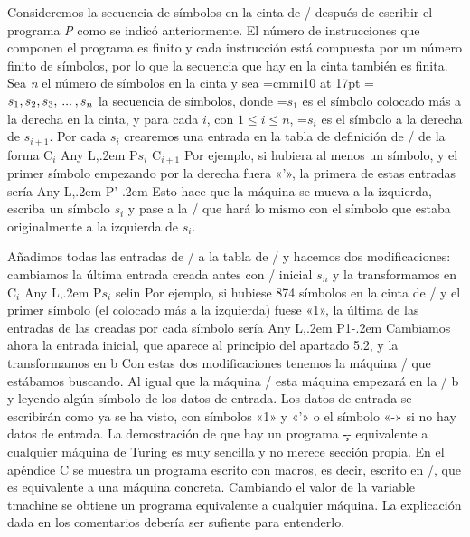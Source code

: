 Consideremos la secuencia de símbolos en la cinta de \E/ después de escribir el programa {\it P}
como se indicó anteriormente. El número de instrucciones que componen el programa es finito y cada
instrucción está compuesta por un número finito de símbolos, por lo que la secuencia que hay en la
cinta también es finita. Sea {\it n} el número de símbolos en la cinta y sea
\encaje
\font\mathlista=cmmi10 at 17pt
=\mathlista
$ s_1, s_2, s_3,\kern.2em ... \kern.2em, s_n $
\finencaje
la secuencia de símbolos, donde {=\mathlista $ s_1 $} es el símbolo colocado más a la derecha
en la cinta, y para cada $ i $, con $ 1\le i \le n $, {=\mathlista $ s_i $ es el símbolo a
la derecha de $ s_{i+1} $}. Por cada $ s_i $ crearemos una entrada en la tabla de definición
de \machcoma/ de la forma
\encaje
{\fcode C${}_{i}$\kern22pt Any\kern22pt L,\kern.2em P$ s_i $\kern21pt C${}_{i+1}$}
\finencaje
Por ejemplo, si hubiera al menos un símbolo, y el primer símbolo empezando por la derecha fuera «’»,
la primera de estas entradas sería
\encaje
{    {\fcode Any\hskip0.3in  L,\kern.2em P’\kern-.2em}    }
\finencaje
Esto hace que la máquina se mueva a la izquierda, escriba un símbolo $ s_i $ y pase a la \configuration/ que
hará lo mismo con el símbolo que estaba originalmente a la izquierda de $ s_i $.

Añadimos todas las entradas de \E/ a la tabla de \machcoma/ y hacemos dos modificaciones: cambiamos
la última entrada creada antes con \configuration/ inicial $ s_n $ y la transformamos en
\encaje
{\fcode C${}_{i}$\kern22pt Any\kern22pt L,\kern.2em P$ s_i $\kern21pt selin}
\finencaje
Por ejemplo, si hubiese 874 símbolos en la cinta de \E/ y el primer símbolo (el colocado más a la
izquierda) fuese «1», la última de las entradas de las creadas por cada símbolo sería
\encaje
{    {\fcode Any\hskip0.3in  L,\kern.2em P1\kern-.2em}    }
\finencaje
Cambiamos ahora la entrada inicial, que aparece al principio del apartado 5.2, y la transformamos en
\encaje
{\mconfig b}      {}
\finencaje
Con estas dos modificaciones tenemos la máquina \machcoma/ que estábamos buscando. Al igual que la
máquina \E/ esta máquina empezará en la \configuration/ {\ffraktur b} y leyendo algún símbolo de los
datos de entrada. Los datos de entrada se escribirán como ya se ha visto, con símbolos «1» y «'» o
el símbolo «-» si no hay datos de entrada.
%
La demostración de que hay un programa \c-- equivalente a cualquier máquina de Turing es muy
sencilla y no merece sección propia. En el apéndice C se muestra un programa escrito con macros,
es decir, escrito en \C/, que es equivalente a una máquina concreta. Cambiando el valor de la
variable {\fgabrielen tmachine} se obtiene un programa equivalente a cualquier máquina. La
explicación dada en los comentarios debería ser sufiente para entenderlo.
